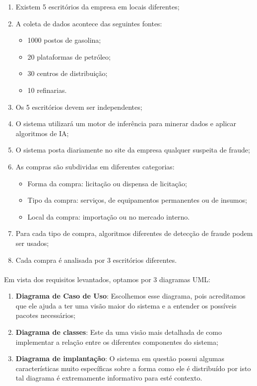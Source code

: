 \documentclass[a4paper,10pt]{article}
\begin{document}
\begin{enumerate}
  \item Existem 5 escritórios da empresa em locais diferentes;
  \item A coleta de dados acontece das seguintes fontes:
    \begin{itemize}
      \item 1000 postos de gasolina;
      \item 20 plataformas de petróleo;
      \item 30 centros de distribuição;
      \item 10 refinarias.
    \end{itemize}
  \item Os 5 escritórios devem ser independentes;
  \item O sistema utilizará um motor de inferência para minerar dados e aplicar
        algoritmos de IA;
  \item O sistema posta diariamente no site da empresa qualquer suspeita de
        fraude;
  \item As compras são subdividas em diferentes categorias:
      \begin{itemize}
         \item Forma da compra: licitação ou dispensa de licitação;
         \item Tipo da compra: serviços, de equipamentos permanentes ou de
               insumos;
         \item Local da compra: importação ou no mercado interno.
      \end{itemize}
   \item Para cada tipo de compra, algoritmos diferentes de detecção de fraude
      podem ser usados;
   \item Cada compra é analisada por 3 escritórios diferentes.
\end{enumerate}

\paragraph{}
Em vista dos requisitos levantados, optamos por 3 diagramas UML:
\begin{enumerate}
  \item \textbf{Diagrama de Caso de Uso}: Escolhemos esse diagrama, pois
        acreditamos que ele ajuda a ter uma visão maior do sistema e a entender
        os possíveis pacotes necessários;
  \item \textbf{Diagrama de classes}: Este da uma visão mais detalhada de como
        implementar a relação entre os diferentes componentes do sistema;
  \item \textbf{Diagrama de implantação}: O sistema em questão possui algumas
        características muito específicas sobre a forma como ele é distribuído
        por isto tal diagrama é extremamente informativo para esté contexto.
\end{enumerate}
\end{document}
